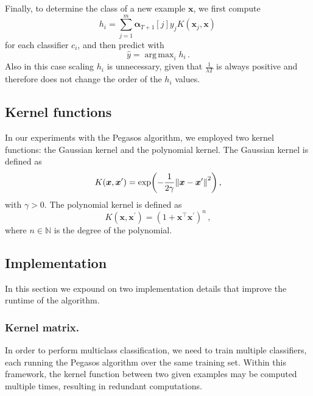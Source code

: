 \documentclass[runningheads]{llncs}
\DeclareMathOperator*{\argmax}{arg\,max}
\begin{document}
Finally, to determine the class of a new example $\bm{x}$, we first compute
\begin{equation}
  h_i = \sum_{j = 1}^{m} \bm{\alpha}_{T+1}[j] y_j K(\bm{x}_j, \bm{x}) \,
  \label{eqn:pegasos:h_i}
\end{equation}
for each classifier $c_i$, and then predict with
\[
  \hat{y} = \argmax_i {h_i} \, .
\]
Also in this case scaling $h_i$ is unnecessary, given that $\frac{1}{\lambda T}$ is always positive and therefore does not change the order of the $h_i$ values.


\subsection{Kernel functions}
\label{subsec:algorithm:kernel}

In our experiments with the Pegasos algorithm, we employed two kernel functions: the Gaussian kernel and the polynomial kernel. The Gaussian kernel is defined as
\begin{equation}
  K(\bm{x},\bm{x}^\prime) = \exp(-\frac{1}{2 \gamma}\norm{\bm{x} - \bm{x}^\prime}^2) \, , \label{eqn:kernel:gaussian}
\end{equation}
with $\gamma > 0$. The polynomial kernel is defined as
\begin{equation}
  K(\bm{x},\bm{x}^\prime) = (1 + \bm{x}^\top \bm{x}^\prime)^n \, , \label{eqn:kernel:polynomial} 
\end{equation}
where $n \in \mathbb{N}$ is the degree of the polynomial. 

\subsection{Implementation}
\label{subsec:algorithm:implementation}

In this section we expound on two implementation details that improve the runtime of the algorithm.

\subsubsection{Kernel matrix.} In order to perform multiclass classification, we need to train multiple classifiers, each running the Pegasos algorithm over the same training set. Within this framework, the kernel function between two given examples may be computed multiple times, resulting in redundant computations.
\end{document}
